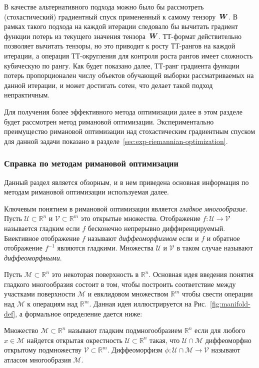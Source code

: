 В качестве альтернативного подхода можно было бы рассмотреть (стохастический) градиентный спуск примененный к самому тензору~$\boldsymbol{W}$. В рамках такого подхода на каждой итерации следовало бы вычитать градиент функции потерь из текущего значения тензора~$\boldsymbol{W}$. ТТ-формат действительно позволяет вычитать тензоры, но это приводит к росту ТТ-рангов на каждой итерации, а операция ТТ-округления для контроля роста рангов имеет сложность кубическую по рангу. Как будет показано далее, ТТ-ранг градиента функции потерь пропорционален числу объектов обучающей выборки рассматриваемых на данной итерации, и может достигать сотен, что делает такой подход непрактичным.

Для получения более эффективного метода оптимизации далее в этом разделе будет рассмотрен метод римановой оптимизации.
Экспериментально преимущество римановой оптимизации над стохастическим градиентным спуском для данной задачи показано в разделе~\ref{sec:exp-riemannian-optimization}.

\subsubsection{Справка по методам римановой оптимизации \label{sec:riemannian-help}}
Данный раздел является обзорным, и в нем приведена основная информация по методам римановой оптимизации используемая далее.

Ключевым понятием в римановой оптимизации является \emph{гладкое многообразие}. Пусть $\mathcal{U} \subset \mathbb{R}^n$ и $\mathcal{V} \subset \mathbb{R}^m$ это открытые множества. Отображение $f: \mathcal{U} \to \mathcal{V}$ называется гладким если $f$ бесконечно непрерывно диффиренцируемый. Биективное отображение $f$ называют \emph{диффеоморфизмом} если и $f$ и обратное отображение $f^{-1}$ являются гладкими. Множества $\mathcal{U}$ и $\mathcal{V}$ в таком случае называют \emph{диффеоморфными}.

Пусть $\mathcal{M} \subset \mathbb{R}^n$ это некоторая поверхность в $\mathbb{R}^n$. Основная идея введения понятия гладкого многообразия состоит в том, чтобы построить соответствие между участками поверхности $\mathcal{M}$ и евклидовом множеством $\mathbb{R}^m$ чтобы свести операции над $\mathcal{M}$ к операциям над $\mathbb{R}^m$. Данная идея иллюстрируется на Рис.~\ref{fig:manifold-def}, а формальное определение дается ниже:
\begin{definition}
	\cite{RS13, Def. 1.3} Множество $\mathcal{M} \subset \mathbb{R}^n$ называют гладким подмногообразием $\mathbb{R}^n$ если для любого $x \in \mathcal{M}$	 найдется открытая окрестность $\mathcal{U} \subset \mathbb{R}^n$ такая, что $\mathcal{U} \cap \mathcal{M}$ диффеоморфно открытому подмножеству $\mathcal{V} \subset \mathbb{R}^m$. Диффеоморфизм $\phi: \mathcal{U} \cap \mathcal{M} \to \mathcal{V}$ называют атласом многообразия $\mathcal{M}$.
\end{definition}

